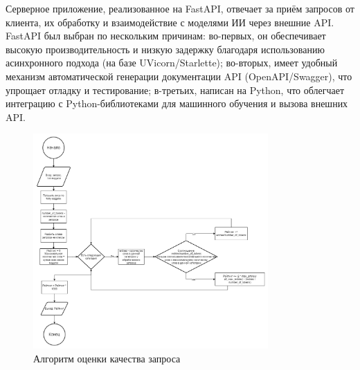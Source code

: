 Серверное приложение, реализованное на FastAPI, отвечает за приём запросов от клиента, их обработку и взаимодействие с моделями ИИ через внешние API. FastAPI был выбран по нескольким причинам: во-первых, он обеспечивает высокую производительность и низкую задержку благодаря использованию асинхронного подхода (на базе UVicorn/Starlette); во-вторых, имеет удобный механизм автоматической генерации документации API (OpenAPI/Swagger), что упрощает отладку и тестирование; в-третьих, написан на Python, что облегчает интеграцию с Python-библиотеками для машинного обучения и вызова внешних API.
\begin{figure}[h]
    \centering
    \includegraphics[width=0.8\textwidth]{picture/rating-algoritm.png}
    \caption{Алгоритм оценки качества запроса}
    \label{rating-algoritm}
\end{figure}


